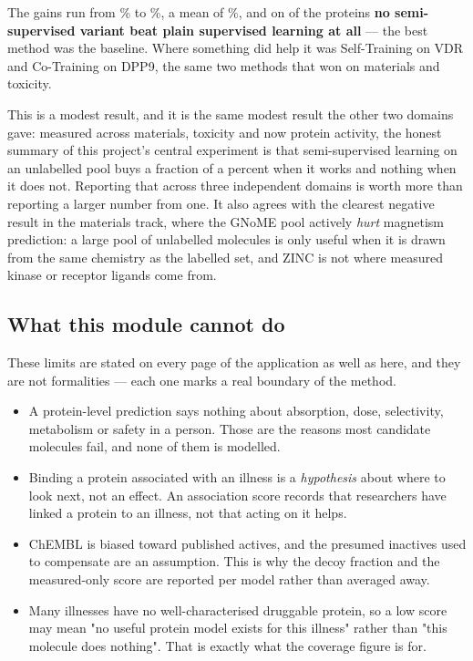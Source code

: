 
The gains run from \TgtSSLMin\% to \TgtSSLMax\%, a mean of \TgtSSLMean\%, and on
\TgtSSLNoGain{} of the \TgtSSLNTargets{} proteins \textbf{no semi-supervised variant beat plain
supervised learning at all} --- the best method was the baseline. Where something did help it was
Self-Training on VDR and Co-Training on DPP9, the same two methods that won on materials and
toxicity.

This is a modest result, and it is the same modest result the other two domains gave: measured
across materials, toxicity and now protein activity, the honest summary of this project's central
experiment is that semi-supervised learning on an unlabelled pool buys a fraction of a percent
when it works and nothing when it does not. Reporting that across three independent domains is
worth more than reporting a larger number from one. It also agrees with the clearest negative
result in the materials track, where the GNoME pool actively \emph{hurt} magnetism prediction: a
large pool of unlabelled molecules is only useful when it is drawn from the same chemistry as the
labelled set, and ZINC is not where measured kinase or receptor ligands come from.

\subsection{What this module cannot do}

These limits are stated on every page of the application as well as here, and they are not
formalities --- each one marks a real boundary of the method.

\begin{itemize}
  \item A protein-level prediction says nothing about absorption, dose, selectivity, metabolism or
    safety in a person. Those are the reasons most candidate molecules fail, and none of them is
    modelled.
  \item Binding a protein associated with an illness is a \emph{hypothesis} about where to look
    next, not an effect. An association score records that researchers have linked a protein to an
    illness, not that acting on it helps.
  \item ChEMBL is biased toward published actives, and the presumed inactives used to compensate
    are an assumption. This is why the decoy fraction and the measured-only score are reported per
    model rather than averaged away.
  \item Many illnesses have no well-characterised druggable protein, so a low score may mean "no
    useful protein model exists for this illness" rather than "this molecule does nothing". That
    is exactly what the coverage figure is for.
\end{itemize}
